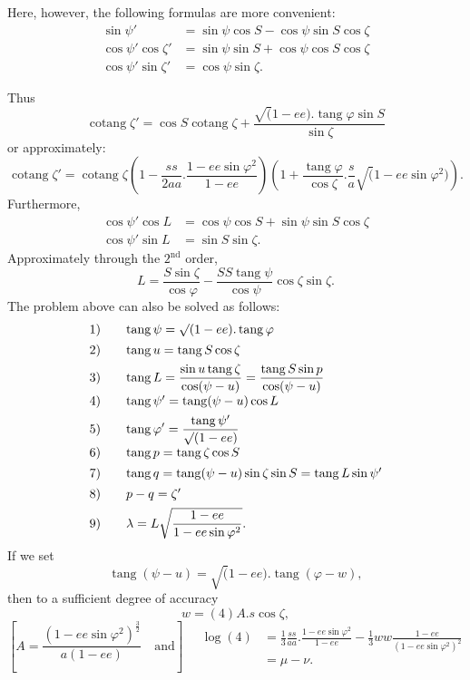 Here, however, the following formulas are more convenient:
\[
\begin{aligned}
\sin\psi'&=\sin\psi\cos S-\cos\psi\sin S\cos\zeta\\
\cos\psi'\cos\zeta'&=\sin\psi\sin S+\cos\psi\cos S\cos\zeta\\
\cos\psi'\sin\zeta'&=\cos\psi\sin\zeta.
\end{aligned}
\]

\clearpage
\noindent{}\makebox[12mm][r]{}\par\medskip
Thus
\[
\operatorname{cotang}\zeta'=\cos S\operatorname{cotang}\zeta
+\frac{\surd(1-ee).\operatorname{tang}\varphi\sin S}{\sin\zeta}
\]
\noindent or approximately:
\[
\operatorname{cotang}\zeta'=\operatorname{cotang}\zeta
\left(1-\frac{ss}{2aa}.\frac{1-ee\sin\varphi^2}{1-ee}\right)
\left(1+\frac{\operatorname{tang}\varphi}{\cos\zeta}.\frac sa\surd(1-ee\sin\varphi^2)\right).
\]
\noindent Furthermore,
\[
\begin{aligned}
\cos\psi'\cos L&=\cos\psi\cos S+\sin\psi\sin S\cos\zeta\\
\cos\psi'\sin L&=\sin S\sin\zeta.
\end{aligned}
\]
\noindent Approximately through the \(2^{\text{nd}}\) order,
\[
L=\frac{S\sin\zeta}{\cos\varphi}
-\frac{SS\operatorname{tang}\psi}{\cos\psi}\cos\zeta\sin\zeta.
\]
The problem above can also be solved as follows:
\[
\begin{array}{r@{\qquad}l}
1)&\operatorname{tang}\psi=\surd(1-ee).\operatorname{tang}\varphi\\[1ex]
2)&\operatorname{tang}u=\operatorname{tang}S\cos\zeta\\[1ex]
3)&\displaystyle\operatorname{tang}L=\frac{\sin u\operatorname{tang}\zeta}{\cos(\psi-u)}
=\frac{\operatorname{tang}S\sin p}{\cos(\psi-u)}\\[1.5ex]
4)&\operatorname{tang}\psi'=\operatorname{tang}(\psi-u)\cos L\\[1ex]
5)&\displaystyle\operatorname{tang}\varphi'=\frac{\operatorname{tang}\psi'}{\surd(1-ee)}\\[1.5ex]
6)&\operatorname{tang}p=\operatorname{tang}\zeta\cos S\\[1ex]
7)&\operatorname{tang}q=\operatorname{tang}(\psi-u)\sin\zeta\sin S=\operatorname{tang}L\sin\psi'\\[1ex]
8)&p-q=\zeta'\\[1ex]
9)&\displaystyle\lambda=L\sqrt{\frac{1-ee}{1-ee\sin\varphi^2}}.
\end{array}
\]
If we set
\[
\operatorname{tang}(\psi-u)=\surd(1-ee).\operatorname{tang}(\varphi-w),
\]
\noindent then to a sufficient degree of accuracy
\[
w=(4)A.s\cos\zeta,
\]
\begingroup\small
\[
\left[A=\frac{(1-ee\sin\varphi^2)^{\frac32}}{a(1-ee)}\quad\text{and}\right]
\quad\begin{aligned}
\log(4)&=\tfrac13\frac{ss}{aa}.\frac{1-ee\sin\varphi^2}{1-ee}
-\tfrac13ww\frac{1-ee}{(1-ee\sin\varphi^2)^2}\\
&=\mu-\nu.
\end{aligned}
\]
\endgroup

